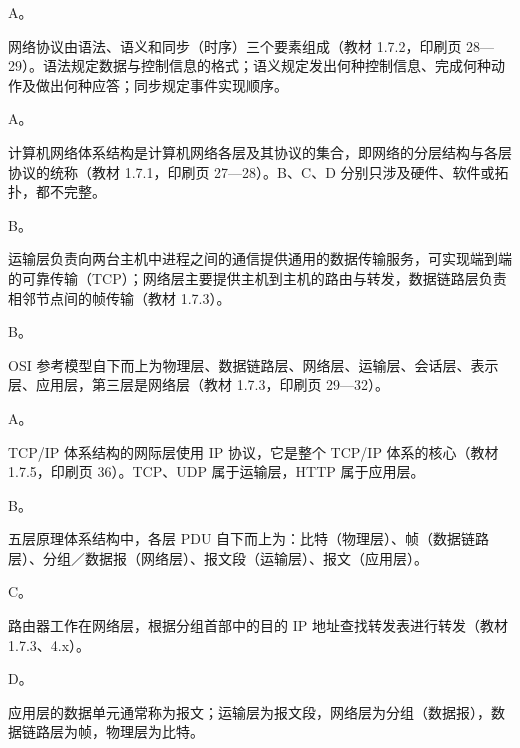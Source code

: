\documentclass[a4paper,11pt]{article}
\begin{document}


\q A。\begin{analysis}网络协议由语法、语义和同步（时序）三个要素组成（教材 1.7.2，印刷页 28—29）。语法规定数据与控制信息的格式；语义规定发出何种控制信息、完成何种动作及做出何种应答；同步规定事件实现顺序。\end{analysis}

\q A。\begin{analysis}计算机网络体系结构是计算机网络各层及其协议的集合，即网络的分层结构与各层协议的统称（教材 1.7.1，印刷页 27—28）。B、C、D 分别只涉及硬件、软件或拓扑，都不完整。\end{analysis}

\q B。\begin{analysis}运输层负责向两台主机中进程之间的通信提供通用的数据传输服务，可实现端到端的可靠传输（TCP）；网络层主要提供主机到主机的路由与转发，数据链路层负责相邻节点间的帧传输（教材 1.7.3）。\end{analysis}

\q B。\begin{analysis}OSI 参考模型自下而上为物理层、数据链路层、网络层、运输层、会话层、表示层、应用层，第三层是网络层（教材 1.7.3，印刷页 29—32）。\end{analysis}

\q A。\begin{analysis}TCP/IP 体系结构的网际层使用 IP 协议，它是整个 TCP/IP 体系的核心（教材 1.7.5，印刷页 36）。TCP、UDP 属于运输层，HTTP 属于应用层。\end{analysis}

\q B。\begin{analysis}五层原理体系结构中，各层 PDU 自下而上为：比特（物理层）、帧（数据链路层）、分组／数据报（网络层）、报文段（运输层）、报文（应用层）。\end{analysis}

\q C。\begin{analysis}路由器工作在网络层，根据分组首部中的目的 IP 地址查找转发表进行转发（教材 1.7.3、4.x）。\end{analysis}

\q D。\begin{analysis}应用层的数据单元通常称为报文；运输层为报文段，网络层为分组（数据报），数据链路层为帧，物理层为比特。\end{analysis}
\end{document}
